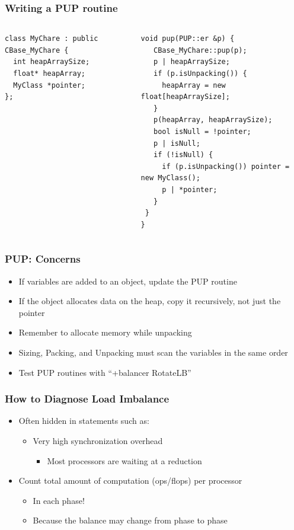 \begin{frame}[fragile]
\frametitle{Writing a PUP routine}
 \begin{columns}
 \begin{column}{0.5\textwidth}
   \begin{lstlisting}
class MyChare : public CBase_MyChare {
  int heapArraySize;
  float* heapArray;
  MyClass *pointer;
};
 \end{lstlisting}
 \end{column}
 \begin{column}{0.5\textwidth}
  \begin{lstlisting}
void pup(PUP::er &p) {
   CBase_MyChare::pup(p);
   p | heapArraySize;
   if (p.isUnpacking()) {
     heapArray = new float[heapArraySize];
   }
   p(heapArray, heapArraySize);
   bool isNull = !pointer;
   p | isNull;
   if (!isNull) {
     if (p.isUnpacking()) pointer = new MyClass();
     p | *pointer;
   }
 }
}
  \end{lstlisting}
  \end{column}
  \end{columns}
\end{frame}


\begin{frame}[fragile]
\frametitle{PUP: Concerns}
\begin{itemize}
\item If variables are added to an object, update the PUP routine
\item If the object allocates data on the heap, copy it recursively, not just the pointer
\item Remember to allocate memory while unpacking
\item Sizing, Packing, and Unpacking must scan the variables in the same order
\item Test PUP routines with “+balancer RotateLB”
\end{itemize}
\end{frame}


\begin{frame}[fragile]
\frametitle{How to Diagnose Load Imbalance}
\begin{itemize}
 \item Often hidden in statements such as:
 \begin{itemize}
  \item Very high synchronization overhead
  \begin{itemize}
   \item Most processors are waiting at a reduction
  \end{itemize}
 \end{itemize}
 \item Count total amount of computation (ops/flops) per processor
 \begin{itemize}
  \item In each phase! 
  \item Because the balance may change from phase to phase
 \end{itemize}
\end{itemize}
\end{frame}

